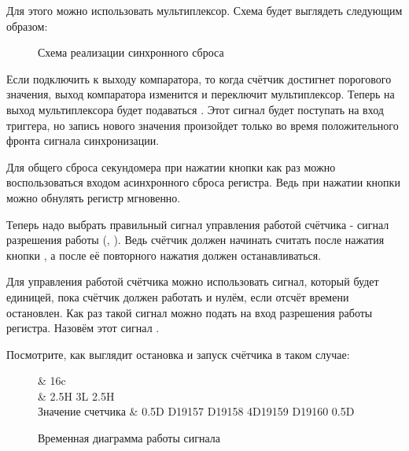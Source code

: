 \par{Для этого можно использовать мультиплексор. Схема будет выглядеть следующим образом:}

\begin{figure}[H]
	\centering
	\def\svgwidth{\columnwidth}
	
	\caption{Схема реализации синхронного сброса}
\end{figure}

\par{Если подключить  к выходу компаратора, то когда счётчик достигнет порогового значения, выход компаратора изменится и переключит мультиплексор. Теперь на выход мультиплексора будет подаваться . Этот сигнал будет поступать на вход триггера, но запись нового значения произойдет только во время положительного фронта сигнала синхронизации.}

\par{Для общего сброса секундомера при нажатии кнопки  как раз можно воспользоваться входом асинхронного сброса регистра. Ведь при нажатии кнопки  можно обнулять регистр мгновенно.}

\par{Теперь надо выбрать правильный сигнал управления работой счётчика - сигнал разрешения работы (, ). Ведь счётчик должен начинать считать после нажатия кнопки , а после её повторного нажатия должен останавливаться.}

\par{Для управления работой счётчика можно использовать сигнал, который будет единицей, пока счётчик должен работать и нулём, если отсчёт времени остановлен. Как раз такой сигнал можно подать на вход разрешения работы регистра. Назовём этот сигнал .}

\par{Посмотрите, как выглядит остановка и запуск счётчика в таком случае:}

\begin{figure}[H]
\centering
\begin{tikztimingtable}[%
    timing/dslope=0.1,
    timing/.style={x=5ex,y=2ex},
    very thick,
    x=3ex,
    timing/rowdist=3.3ex,
    timing/name/.style={font=\sffamily\scriptsize},
]
				& 16{c} \\
		& 2.5H 3L 2.5H\\
	Значение счетчика	& 0.5D{} D{19157} D{19158} 4D{19159} D{19160} 0.5D{}\\
\extracode
\end{tikztimingtable}
\caption{Временная диаграмма работы сигнала }
\end{figure}

